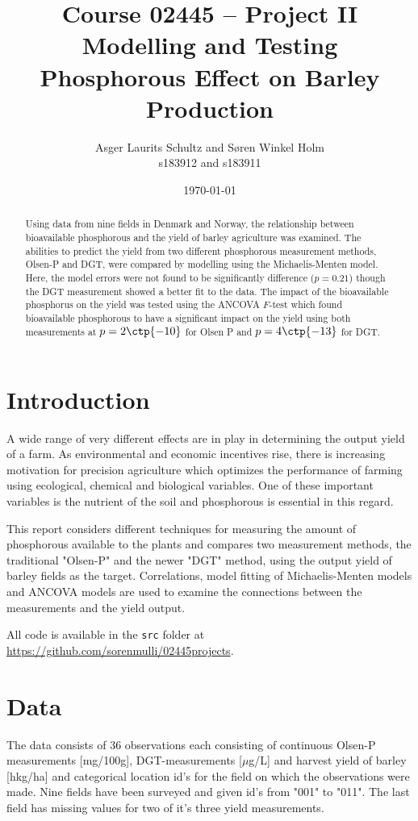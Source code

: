 \documentclass[11pt,fleqn]{article}
\title{Course 02445 -- Project II\\Modelling and Testing Phosphorous Effect on Barley Production }
\author{Asger Laurits Schultz and Søren Winkel Holm\\s183912 and s183911}
\date{\today}
\begin{document}
\maketitle
\thispagestyle{empty}


\clearpage
\setcounter{page}{1}
\renewcommand{\abstractname}{Summary}
\begin{abstract}
\noindent
Using data from nine fields in Denmark and Norway, the relationship between bioavailable phosphorous and the yield of barley agriculture was examined. 
The abilities to predict the yield from two different phosphorous measurement methods, Olsen-P and DGT, were compared by modelling using the Michaelis-Menten model. Here, the model errors were not found to be significantly difference ($ p=0.21 $) though the DGT measurement showed a better fit to the data.
The impact of the bioavailable phosphorus on the yield was tested using the ANCOVA \(F\)-test which found bioavailable phosphorous to have a significant impact on the yield using both measurements at $ p=2\ctp{-10} $ for Olsen P and $ p=4\ctp{-13} $ for DGT.
\end{abstract}


\section{Introduction}
A wide range of very different effects are in play in determining the output yield of a farm.
As environmental and economic incentives rise, there is increasing motivation for precision agriculture which optimizes the performance of farming using ecological, chemical and biological variables.
One of these important variables is the nutrient of the soil and phosphorous is essential in this regard.


This report considers different techniques for measuring the amount of phosphorous available to the plants and compares two measurement methods, the traditional "Olsen-P" and the newer "DGT" method, using the output yield of barley fields as the target.  
Correlations, model fitting of Michaelis-Menten models and ANCOVA models are used to examine the connections between the measurements and the yield output.

All code is available in the \texttt{src} folder at \url{https://github.com/sorenmulli/02445projects}.

\section{Data}
The data consists of 36 observations each consisting of continuous  Olsen-P measurements [mg/100g], DGT-measurements [\(\mu\)g/L] and harvest yield of barley [hkg/ha] and categorical location id's for the field on which the observations were made. Nine fields have been surveyed and given id's from "001" to "011". The last field has missing values for two of it's three yield measurements.  
\end{document}
